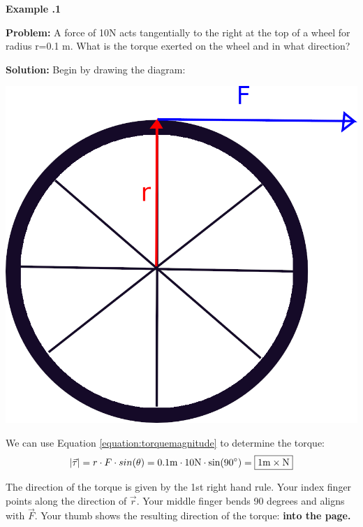 	\begin{mdframed}[backgroundcolor=blue!10!white]
		\begin{center}
			
			
			\textbf{Example \thesection.1}	
		\end{center}
		\vspace{0.1in}
		\textbf{Problem:} A force of 10N acts tangentially to the right at the top of a wheel for radius r=0.1 m.  What is the torque exerted on the wheel and in what direction? 
		
		\vspace{0.1in}
		
		\textbf{Solution:} 
		Begin by drawing the diagram:
		\vspace{0.1in}
		
		\includegraphics{"./Chapters/Ch09-RotationalMechanics/wheel.png"}
		\vspace{0.1in}
		
		We can use Equation \ref{equation:torquemagnitude} to determine the torque:
		\begin{equation*}
			|\vec{\tau}| = r \cdot F \cdot sin (\theta) = 0.1 \si{m} \cdot 10 \si{N} \cdot \sin( 90 \degree) = \boxed{1 \si{m \times N}}
		\end{equation*}
		
		The direction of the torque is given by the 1st right hand rule.  Your index finger points along the direction of $\vec{r}$.  Your middle finger bends 90 degrees and aligns with $\vec F$.  Your thumb shows the resulting direction of the torque: \textbf{into the page.}
		
	\end{mdframed}
	
